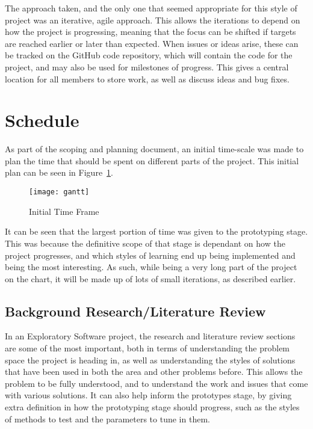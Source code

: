 The approach taken, and the only one that seemed appropriate for this style of
project was an iterative, agile approach. This allows the iterations to depend
on how the project is progressing, meaning that the focus can be shifted if
targets are reached earlier or later than expected.  When issues or ideas arise,
these can be tracked on the GitHub code repository, which will contain the code
for the project, and may also be used for milestones of progress. This gives a
central location for all members to store work, as well as discuss ideas and bug
fixes.

\section{Schedule}

As part of the scoping and planning document, an initial time-scale was made
to plan the time that should be spent on different parts of the project.
This initial plan can be seen in Figure~\ref{fig:gantt}.

\begin{figure}[h!]
    \centering
    \texttt{[image: gantt]}
    \caption{Initial Time Frame}%
    \label{fig:gantt}
\end{figure}

It can be seen that the largest portion of time was given to the prototyping
stage. This was because the definitive scope of that stage is dependant on how
the project progresses, and which styles of learning end up being implemented
and being the most interesting. As such, while being a very long part of the
project on the chart, it will be made up of lots of small iterations, as
described earlier.

\subsection{Background Research/Literature Review}

In an Exploratory Software project, the research and literature review sections
are some of the most important, both in terms of understanding the problem
space the project is heading in, as well as understanding the styles of
solutions that have been used in both the area and other problems before.
This allows the problem to be fully understood, and to understand the work
and issues that come with various solutions. It can also help inform
the prototypes stage, by giving extra definition in how the prototyping stage
should progress, such as the styles of methods to test and the parameters to tune
in them.

